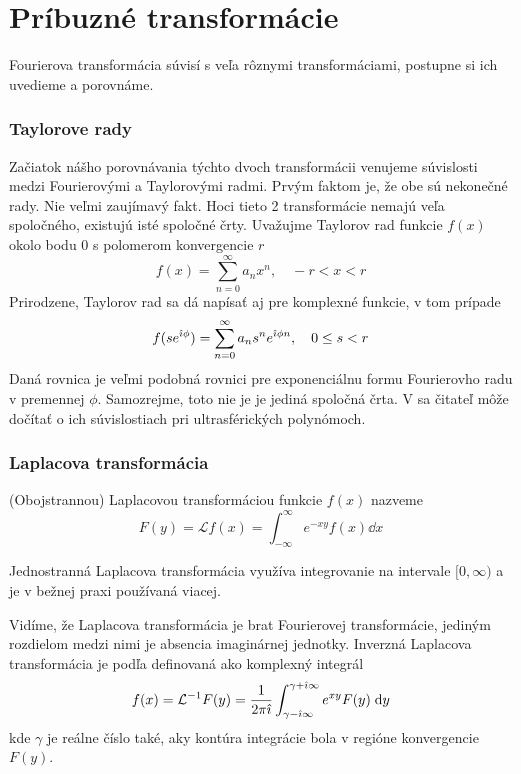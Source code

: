 \section{Príbuzné transformácie}

Fourierova transformácia súvisí s veľa rôznymi transformáciami,
postupne si ich uvedieme a porovnáme.

\subsubsection{Taylorove rady}
Začiatok nášho porovnávania týchto dvoch transformácii venujeme
súvislosti medzi Fourierovými a Taylorovými radmi. Prvým faktom je, že
obe sú nekonečné rady. Nie veľmi zaujímavý fakt. Hoci tieto 2
transformácie nemajú veľa spoločného, existujú isté spoločné črty.
Uvažujme Taylorov rad funkcie $f(x)$ okolo bodu 0 s polomerom konvergencie $r$
\begin{equation}
    f(x) = \sum_{n=0}^{\infty} a_n x^n, \quad -r < x < r
\end{equation}
Prirodzene, Taylorov rad sa dá napísať aj pre komplexné funkcie, v tom
prípade
\begin{equation}
    f(s e^{\hat{\imath} \phi}) = \sum_{n=0}^{\infty} a_n s^n e^{\hat{\imath} \phi n},
        \quad  0 \le s <r
\end{equation}
Daná rovnica je veľmi podobná rovnici \todo{} pre exponenciálnu formu
Fourierovho radu v premennej $\phi$.
Samozrejme, toto nie je je jediná spoločná črta. V \cite{taylor} sa
čitateľ môže dočítať o ich súvislostiach pri ultrasférických
polynómoch.


\subsubsection{Laplacova transformácia}
\begin{definicia}
(Obojstrannou) Laplacovou transformáciou funkcie $f(x)$ nazveme
\begin{equation}
F(y) = \mathcal{L} f(x) = \int_{-\infty}^{\infty} e^{-xy} f(x) \dd x
\end{equation}
\end{definicia}
\begin{poznamka}
    Jednostranná Laplacova transformácia využíva integrovanie na
    intervale $[0,\infty)$ a je v bežnej praxi používaná viacej.
\end{poznamka}
Vidíme, že Laplacova transformácia je brat Fourierovej transformácie,
jediným rozdielom medzi nimi je absencia imaginárnej jednotky.
Inverzná Laplacova transformácia je podľa \cite{lpt} 
definovaná ako komplexný integrál
\begin{equation}
    f(x) = \mathcal{L}^{-1} F(y) = \frac{1}{2 \pi \hat{\imath}}
        \int_{\gamma - \hat{\imath} \infty}^{\gamma + \hat{\imath} \infty}
        e^{x y} F(y) \; \mathrm{d} y
\end{equation}
kde $\gamma$ je reálne číslo také, aky kontúra  integrácie bola v
regióne konvergencie $F(y)$.

